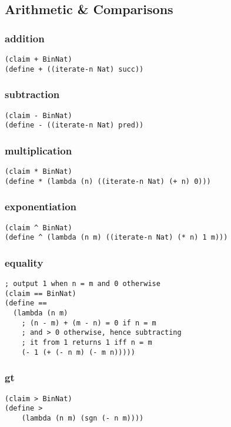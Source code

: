 \subsection{Arithmetic \& Comparisons}

\subsubsection{addition} \label{code:addition}
\begin{verbatim}
(claim + BinNat)
(define + ((iterate-n Nat) succ))
\end{verbatim}

\subsubsection{subtraction} \label{code:subtraction}
\begin{verbatim}
(claim - BinNat)
(define - ((iterate-n Nat) pred))
\end{verbatim}

\subsubsection{multiplication} \label{code:multiplication}
\begin{verbatim}
(claim * BinNat)
(define * (lambda (n) ((iterate-n Nat) (+ n) 0)))
\end{verbatim}

\subsubsection{exponentiation} \label{code:exponentiation}
\begin{verbatim}
(claim ^ BinNat)
(define ^ (lambda (n m) ((iterate-n Nat) (* n) 1 m)))
\end{verbatim}

\subsubsection{equality} \label{code:equality}
\begin{verbatim}
; output 1 when n = m and 0 otherwise
(claim == BinNat)
(define ==
  (lambda (n m)
    ; (n - m) + (m - n) = 0 if n = m
    ; and > 0 otherwise, hence subtracting
    ; it from 1 returns 1 iff n = m
    (- 1 (+ (- n m) (- m n)))))
\end{verbatim}

\subsubsection{gt} \label{code:gt}
\begin{verbatim}
(claim > BinNat)
(define >
    (lambda (n m) (sgn (- n m))))
\end{verbatim}

